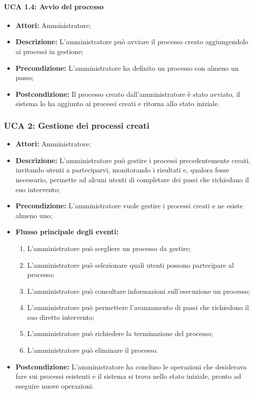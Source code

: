 \paragraph{UCA 1.4: Avvio del processo}
\begin{itemize}
\item \textbf{Attori:}
 Amministratore;
\item \textbf{Descrizione:} 
L'amministratore può avviare il processo creato aggiungendolo ai processi in gestione; 
\item \textbf{Precondizione:} 
L'amministratore ha definito un processo con almeno un passo;
\item \textbf{Postcondizione:} 
Il processo creato dall'amministratore è stato avviato, il sistema lo ha aggiunto ai processi creati e ritorna allo stato iniziale.
\end{itemize}

\subsubsection{UCA 2: Gestione dei processi creati}
\begin{itemize}
\item \textbf{Attori:}
 Amministratore;
\item \textbf{Descrizione:} 
L'amministratore può gestire i processi precedentemente creati, invitando utenti a parteciparvi, monitorando i risultati e, qualora fosse necessario, permette ad alcuni utenti di completare dei passi che richiedano il suo intervento;
\item \textbf{Precondizione:} 
L'amministratore vuole gestire i processi creati e ne esiste almeno uno;
\item \textbf{Flusso principale degli eventi:} 
\begin{enumerate}
\item L'amministratore può scegliere un processo da gestire;
\item L'amministratore può selezionare quali utenti possono partecipare al processo;
\item L'amministratore può consultare informazioni sull'esecuzione un processo;
\item L'amministratore può permettere l'avanzamento di passi che richiedono il suo diretto intervento;
\item L'amministratore può richiedere la terminazione del processo;
\item L'amministratore può eliminare il processo.
\end{enumerate}
\item \textbf{Postcondizione:} 
L'amministratore ha concluso le operazioni che desiderava fare sui processi esistenti e il sistema si trova nello stato iniziale, pronto ad eseguire nuove operazioni.
\end{itemize}

